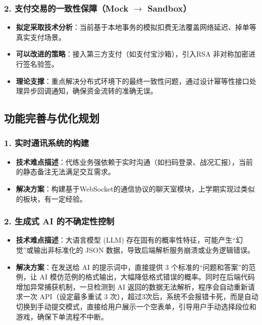 \documentclass[12pt,a4paper]{article}
\begin{document}
\subsubsection{2. 支付交易的一致性保障（Mock $\rightarrow$ Sandbox）}
\begin{itemize}
    \item \textbf{拟定采取技术分析}：当前基于本地事务的模拟扣费无法覆盖网络延迟、掉单等真实支付场景。
    \item \textbf{可以改进的策略}：接入第三方支付（如支付宝沙箱），引入RSA 非对称加密进行签名验签。
    \item \textbf{理论支撑}：重点解决分布式环境下的最终一致性问题，通过设计幂等性接口处理异步回调通知，确保资金流转的准确无误。
\end{itemize}

\subsection{功能完善与优化规划}

\subsubsection{1. 实时通讯系统的构建}
\begin{itemize}
    \item \textbf{技术难点描述}：代练业务强依赖于实时沟通（如扫码登录、战况汇报），当前的静态备注无法满足交互需求。
    \item \textbf{解决方案}：构建基于WebSocket的通信协议的聊天室模块，上学期实现过类似的板块，有一定经验。
\end{itemize}

\subsubsection{2. 生成式 AI 的不确定性控制}
\begin{itemize}
    \item \textbf{技术难点描述}：大语言模型 (LLM) 存在固有的概率性特征，可能产生“幻觉”或输出非标准化的 JSON 数据，导致后端解析服务崩溃或业务逻辑错误。
    \item \textbf{解决方案}：在发送给 AI 的提示词中，直接提供 3 个标准的“问题和答案”的范例，让 AI 模仿范例的格式输出，大幅降低格式错误的概率。同时在后端代码增加异常捕获机制，一旦检测到 AI 返回的数据无法解析，程序会自动重新请求一次 API（设定最多重试 3 次），超过3次后，系统不会报错卡死，而是自动切换到手动提交模式，直接给用户展示一个空表单，引导用户手动选择段位和游戏，确保下单流程不中断。
\end{itemize}
\end{document}
